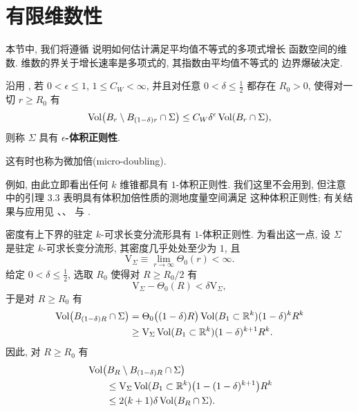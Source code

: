 \section{有限维数性}
\label{sec:3.5}

本节中, 我们将遵循 \cite{CM16} 说明如何估计满足平均值不等式的多项式增长
函数空间的维数. 维数的界关于增长速率是多项式的, 其指数由平均值不等式的
边界爆破决定.

沿用 \cite{CM16}, 若 $0<\epsilon\leq1$, $1\leq C_W<\infty$, 并且对任意
$0<\delta\leq\frac12$ 都存在 $R_0>0$, 使得对一切 $r\geq R_0$ 有
\begin{equation}
\operatorname{Vol}\bigl(B_r\setminus B_{(1-\delta)r}\cap\Sigma\bigr)
 \leq C_W\delta^\epsilon\operatorname{Vol}(B_r\cap\Sigma),
\label{eq:3.83}
\end{equation}
则称 $\Sigma$ 具有 \textbf{$\epsilon$-体积正则性}.

这有时也称为微加倍(micro-doubling).

例如, 由此立即看出任何 $k$ 维锥都具有 $1$-体积正则性. 我们这里不会用到,
但注意 \cite{CM16} 中的引理 3.3 表明具有体积加倍性质的测地度量空间满足
这种体积正则性; 有关结果与应用见 \cite{Ch}、\cite{NrPy}、\cite{NrTa}
与 \cite{Te}.

密度有上下界的驻定 $k$-可求长变分流形具有 $1$-体积正则性. 为看出这一点,
设 $\Sigma$ 是驻定 $k$-可求长变分流形, 其密度几乎处处至少为 $1$, 且
\begin{equation}
\mathrm{V}_\Sigma\equiv\lim_{r\to\infty}\Theta_0(r)<\infty.
\label{eq:3.84}
\end{equation}
给定 $0<\delta\leq\frac12$, 选取 $R_0$ 使得对 $R\geq R_0/2$ 有
\begin{equation}
\mathrm{V}_\Sigma-\Theta_0(R)<\delta\mathrm{V}_\Sigma,
\label{eq:3.85}
\end{equation}
于是对 $R\geq R_0$ 有
\begin{equation}
\begin{aligned}
\operatorname{Vol}\bigl(B_{(1-\delta)R}\cap\Sigma\bigr)
&=\Theta_0\bigl((1-\delta)R\bigr)\operatorname{Vol}(B_1\subset\mathbb{R}^k)(1-\delta)^kR^k\\
&\geq\mathrm{V}_\Sigma\operatorname{Vol}(B_1\subset\mathbb{R}^k)(1-\delta)^{k+1}R^k.
\end{aligned}
\label{eq:3.86}
\end{equation}
因此, 对 $R\geq R_0$ 有
\begin{equation}
\begin{aligned}
&\operatorname{Vol}\bigl(B_R\setminus B_{(1-\delta)R}\cap\Sigma\bigr)\\
&\qquad\leq\mathrm{V}_\Sigma\operatorname{Vol}(B_1\subset\mathbb{R}^k)
 \bigl(1-(1-\delta)^{k+1}\bigr)R^k\\
&\qquad\leq2(k+1)\delta\operatorname{Vol}(B_R\cap\Sigma).
\end{aligned}
\label{eq:3.87}
\end{equation}

